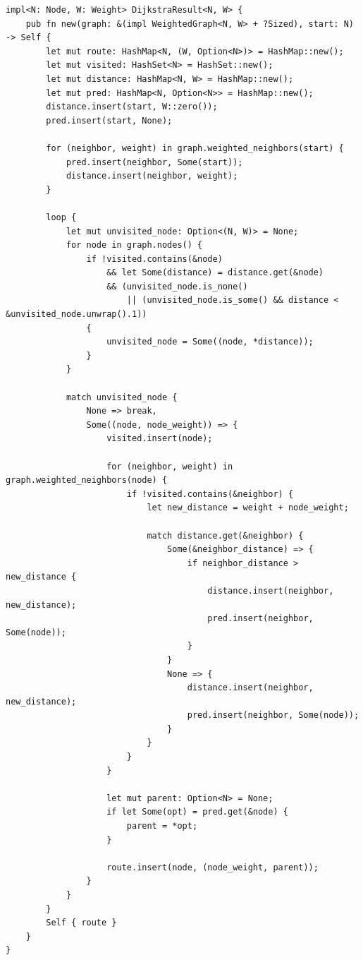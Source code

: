 \begin{listing}[H]
  \caption{Implementação do Algoritmo de Dijkstra}
\begin{verbatim}
impl<N: Node, W: Weight> DijkstraResult<N, W> {
    pub fn new(graph: &(impl WeightedGraph<N, W> + ?Sized), start: N) -> Self {
        let mut route: HashMap<N, (W, Option<N>)> = HashMap::new();
        let mut visited: HashSet<N> = HashSet::new();
        let mut distance: HashMap<N, W> = HashMap::new();
        let mut pred: HashMap<N, Option<N>> = HashMap::new();
        distance.insert(start, W::zero());
        pred.insert(start, None);

        for (neighbor, weight) in graph.weighted_neighbors(start) {
            pred.insert(neighbor, Some(start));
            distance.insert(neighbor, weight);
        }

        loop {
            let mut unvisited_node: Option<(N, W)> = None;
            for node in graph.nodes() {
                if !visited.contains(&node)
                    && let Some(distance) = distance.get(&node)
                    && (unvisited_node.is_none()
                        || (unvisited_node.is_some() && distance < &unvisited_node.unwrap().1))
                {
                    unvisited_node = Some((node, *distance));
                }
            }

            match unvisited_node {
                None => break,
                Some((node, node_weight)) => {
                    visited.insert(node);

                    for (neighbor, weight) in graph.weighted_neighbors(node) {
                        if !visited.contains(&neighbor) {
                            let new_distance = weight + node_weight;

                            match distance.get(&neighbor) {
                                Some(&neighbor_distance) => {
                                    if neighbor_distance > new_distance {
                                        distance.insert(neighbor, new_distance);
                                        pred.insert(neighbor, Some(node));
                                    }
                                }
                                None => {
                                    distance.insert(neighbor, new_distance);
                                    pred.insert(neighbor, Some(node));
                                }
                            }
                        }
                    }

                    let mut parent: Option<N> = None;
                    if let Some(opt) = pred.get(&node) {
                        parent = *opt;
                    }

                    route.insert(node, (node_weight, parent));
                }
            }
        }
        Self { route }
    }
}
\end{verbatim}
\end{listing}


